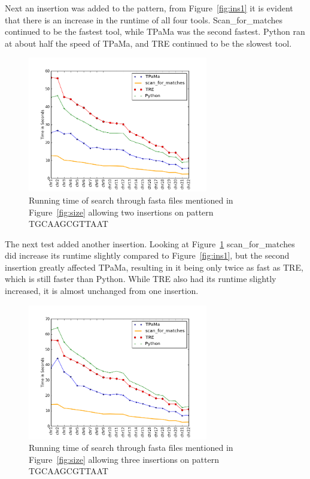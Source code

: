 Next an insertion was added to the pattern, from Figure~\ref{fig:ins1} it is evident that there is an increase in the runtime of all four tools. Scan\_for\_matches continued to be the fastest tool, while TPaMa was the second fastest. Python ran at about half the speed of TPaMa, and TRE continued to be the slowest tool.

\begin{figure}[h!]
\centering
\includegraphics[width=0.7\textwidth]{Benchmarking/2ins.png}
\caption{Running time of search through fasta files mentioned in Figure~\ref{fig:size} allowing two insertions on pattern TGCAAGCGTTAAT}
\label{fig:ins2}
\end{figure}

The next test added another insertion. Looking at Figure~\ref{fig:ins2} scan\_for\_matches did increase its runtime slightly compared to Figure~\ref{fig:ins1}, but the second insertion greatly affected TPaMa, resulting in it being only twice as fast as TRE, which is still faster than Python.  While TRE also had its runtime slightly increased, it is almost unchanged from one insertion.
\newpage
\begin{figure}[h!]
\centering
\includegraphics[width=0.7\textwidth]{Benchmarking/3ins.png}
\caption{Running time of search through fasta files mentioned in Figure~\ref{fig:size} allowing three insertions on pattern TGCAAGCGTTAAT}
\label{fig:ins3}
\end{figure}

